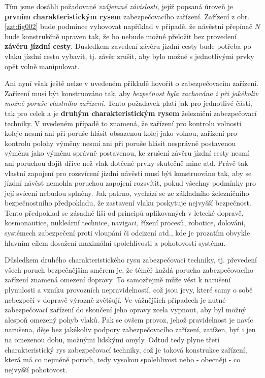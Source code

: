   Tím jsme dosáhli požadované \emph{vzájemné závislosti}, jejíž popsaná úroveň je \textbf{prvním
  charakteristickým rysem} zabezpečovacího zařízení. Zařízení z obr. \ref{zzt:fig002} bude podmínce 
  vyhovovat například v případě, že návěstní přepínač \(N\) bude konstrukčně upraven tak, že ho 
  nebude možné přeložit bez provedení \textbf{závěru jízdní cesty}. Důsledkem zavedení závěru 
  jízdní cesty bude potřeba po vlaku jízdní cestu vybavit, tj. závěr zrušit, aby bylo možné s 
  jednotlivými prvky opět volně manipulovat. 

  Ani nyní však ještě nelze v uvedeném příkladě hovořit o zabezpečovacím zařízení. Zařízení musí
  být konstruováno tak, aby \emph{bezpečnost byla zachována i při jakékoliv možné poruše vlastního 
  zařízení}. Tento  požadavek platí jak pro jednotlivé části, tak pro celek a je \textbf{druhým 
  charakteristickým rysem} železniční zabezpečovací techniky. V uvedeném případě to znamená, že 
  zařízení pro kontrolu volnosti koleje nesmí ani při poruše hlásit obsazenou kolej jako volnou, 
  zařízení pro kontrolu polohy výměny nesmí ani při poruše hlásit nesprávně postavenou výměnu jako 
  výměnu správně postavenou, ke zrušení závěru jízdní cesty nesmí ani poruchou dojít dříve než vlak 
  dotčené prvky skutečně mine atd. Právě tak vlastní zapojení pro rozsvícení jízdní návěsti musí 
  být konstruováno tak, aby se jízdní návěst nemohla poruchou zapojení rozsvítit, pokud všechny 
  podmínky pro její svícení nebudou splněny. Jak patrno, vychází se ze základního železničního
  bezpečnostního předpokladu, že zastavení vlaku poskytuje nejvyšší bezpečnost. Tento předpoklad se 
  zásadně liší od principů aplikovaných v letecké dopravě, kosmonautice, nukleární technice, 
  navigaci, řízení procesů, robotice, dolování, systémech zabezpečení proti vloupání či odcizení 
  atd., kde je prozatím obvykle hlavním cílem dosažení maximální spolehlivosti a pohotovosti 
  systému.
  
  Důsledkem druhého charakteristického rysu zabezpečovací techniky, tj. převedení všech poruch
  bezpečnějším směrem je, že téměř každá porucha zabezpečovacího zařízení znamená omezení dopravy. 
  To samozřejmě může vést k narušení plynulosti a vzniku provozních nepravidelností, což jsou jevy, 
  které samy o sobě nebezpečí v dopravě výrazně zvětšují. Ve vážnějších případech je nutné 
  zabezpečovací zařízení do skončení jeho opravy zcela vypnout, aby byl možný alespoň omezený pohyb 
  vlaků. Pak se ovšem provoz, jehož pravidelnost je navíc narušena, děje bez jakékoliv podpory 
  zabezpečovacího zařízení, zatížen, byť i jen na omezenou dobu, možnými lidskými omyly. Odtud tedy 
  plyne třetí charakteristický rys zabezpečovací techniky, což je taková konstrukce zařízení, která 
  má co nejméně poruch, tedy vysokou spolehlivost nebo - obecněji - co nejvyšší pohotovost. 
 
